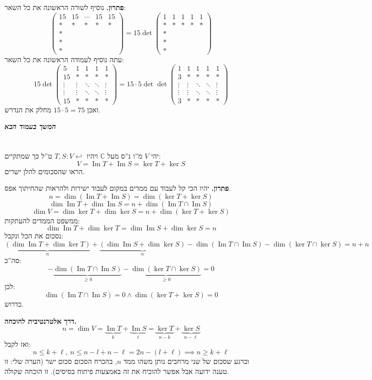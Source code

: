 \documentclass[]{article}
\newcommand\npage {\vfil {\hfil \textbf{\textit{המשך בעמוד הבא}}} \hfil \vfil \pagebreak}
\newcommand\C     {\mathbb{C}}
\newcommand\ml    {\ell}
\DeclareMathOperator\Img   {Im}
\newcommand\co        {\colon}
\newcommand\pms[1]    {\begin{pmatrix}
		#1
\end{pmatrix}}
\theoremstyle{definition}
\newcommand\lilyarr {\hookleftarrow}
\begin{document}
	\textbf{פתרון. }נוסיף לשורה הראשונה את כל השאר: 
	\[ \pms{15 & 15 & \cdots & 15 & 15 \\ * & * & * & * & * \\ * \\ * \\ *} = 15 \det\pms{1 & 1 & 1 & 1 & 1\\ * & * & * & * & * \\ * \\ * \\ *} \]
	עתה נוסיף לעמודה הראשונה את כל השאר: 
	\[ 15\det\pms{5 & 1 & 1 & 1 & 1 \\ 15 & * & * & * & * \\ \vdots & \vdots & \ddots & \ddots & \vdots \\ \vdots & \vdots & \ddots & \ddots & \vdots \\ 15 & * & * & * & *} = 15 \cdot 5 \det \det\pms{1 & 1 & 1 & 1 & 1 \\ 3 & * & * & * & * \\ \vdots & \vdots & \ddots & \ddots & \vdots \\ \vdots & \vdots & \ddots & \ddots & \vdots \\ 3 & * & * & * & *} \]
	ואכן $15 \cdot 5 = 75$ מחלק את הנדרש. 
	
	\npage
	\section{}
	יהי $V$ מ''ו נ''ס מעל $\C$ ויהיו $T, S \co V \lilyarr$ ט''ל כך שמתקיים: 
	\[ V = \Img T + \Img S = \ker T + \ker S \]
	הראו שהסכומים להלן ישרים. 
	
	\textbf{פתרון. }יהיו הכי קל לעבוד עם ממדים במקום לעבוד ישירות ולהראות שהחיתוך אפס. 
	\[ n = \dim (\Img T + \Img S) = \dim (\ker T + \ker S) \]
	\[ \dim \Img T + \dim \Img S = n + \dim(\Img T \cap \Img S) \]
	\[ \dim V = \dim \ker T + \dim \ker S = n + \dim (\ker T + \ker S) \]
	ממשפט הממדים להעתקות: 
	\[ \dim \Img T + \dim \ker T = \dim \Img S + \dim \ker S = n \]
	נסכום את הכל ונקבל: 
	\[ \underbrace{(\dim \Img T + \dim \ker T)}_n + \underbrace{(\dim \Img S + \dim \ker S)}_n - \dim (\Img T \cap \Img S) - \dim (\ker T \cap \ker S) = n + n \]
	סה''כ: 
	\[ -\underbrace{\dim(\Img T \cap \Img S)}_{\ge 0} - \underbrace{\dim(\ker T \cap \ker S)}_{\ge 0} = 0 \]
	לכן: 
	\[ \dim (\Img T \cap \Img S) = 0 \land \dim (\ker T + \ker S) = 0 \]
	כדרוש. 
	
	\textbf{דרך אלטרנטיבית להוכחה. }
	\[ n = \dim V = \underbrace{\Img T}_k + \underbrace{\Img S}_{\ml} = \underbrace{\ker T}_{n - k} + \underbrace{\ker S}_{n- \ml} \]
	ואז לקבל: 
	\[ n \le k + \ml, \ n \le n- l + n - \ml = 2n - (l + \ml) \implies n \ge k + \ml \]
	וברגע שסכום של שני מרחבים נותן משהו ממד $n$, בהכרח הסכום סכום ישר (הערה שלי: זו טענה ידועה אבל אפשר להוכיח את זה באמצעות פיתוח בסיסים). זו הוכחה שקולה. 
	
\end{document}
